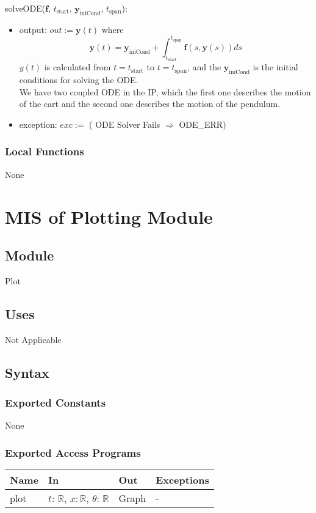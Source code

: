 \documentclass[12pt, titlepage]{article}
\begin{document}
\noindent solveODE($\textbf{f}$, $t_\text{start}$, $\textbf{y}_\text{iniCond}$, $t_\text{span}$): 
\begin{itemize}
\item output: $out := \textbf{y}(t)$ where 
$$\textbf{y}(t) = \textbf{y}_\text{iniCond} + \int_{t_\text{start}}^{t_\text{span}} \textbf{f}(s, \textbf{y}(s)) ds$$ 
$y(t)$ is calculated from $t = t_\text{start}$ to $t = t_\text{span}$, and the $\textbf{y}_\text{iniCond}$ is the initial conditions for solving the ODE.\\
We have two coupled ODE in the IP, which the first one describes the motion of the cart and the second one describes the motion of the pendulum.

\item exception: $exc :=$ ( ODE Solver Fails $\Rightarrow$ ODE\_ERR)
\end{itemize}

\subsubsection{Local Functions}
None
\newpage


\section{MIS of Plotting Module \label{MPlot}}


\subsection{Module}
Plot
\subsection{Uses}
Not Applicable

\subsection{Syntax}

\subsubsection{Exported Constants}
None
\subsubsection{Exported Access Programs}
\begin{center}
\begin{tabular}{p{2cm} p{4cm} p{2cm} p{2cm}}
\hline
\textbf{Name} & \textbf{In} & \textbf{Out} & \textbf{Exceptions} \\
\hline
plot & $t$: $\mathbb{R}$, $x$$: \mathbb{R}$, $\theta$: $\mathbb{R}$ & Graph & - \\
\hline
\end{tabular}
\end{center}
\end{document}
